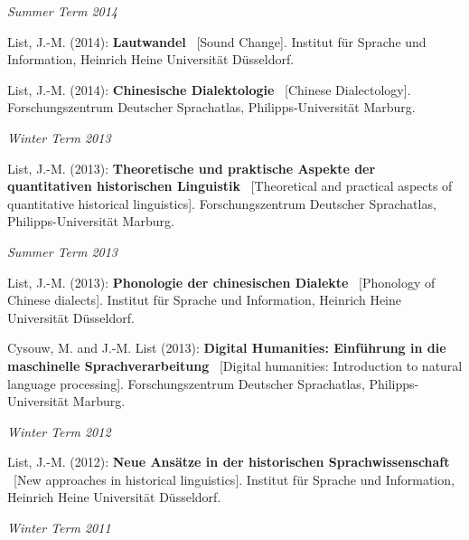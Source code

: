 \noindent\textit{Summer Term 2014}\par\nopagebreak\vspace{0.25cm}
\nopagebreak\noindent List, J.-M. (2014): \textbf{Lautwandel} \ [Sound Change]. Institut für Sprache und Information, Heinrich Heine Universität Düsseldorf.\vspace{0.25cm}
\par
\nopagebreak\noindent List, J.-M. (2014): \textbf{Chinesische Dialektologie} \ [Chinese Dialectology]. Forschungszentrum Deutscher Sprachatlas, Philipps-Universität Marburg.\vspace{0.25cm}
\par
\noindent\textit{Winter Term 2013}\par\nopagebreak\vspace{0.25cm}
\nopagebreak\noindent List, J.-M. (2013): \textbf{Theoretische und praktische Aspekte der quantitativen historischen Linguistik} \ [Theoretical and practical aspects of quantitative historical linguistics]. Forschungszentrum Deutscher Sprachatlas, Philipps-Universität Marburg.\vspace{0.25cm}
\par
\noindent\textit{Summer Term 2013}\par\nopagebreak\vspace{0.25cm}
\nopagebreak\noindent List, J.-M. (2013): \textbf{Phonologie der chinesischen Dialekte} \ [Phonology of Chinese dialects]. Institut für Sprache und Information, Heinrich Heine Universität Düsseldorf.\vspace{0.25cm}
\par
\nopagebreak\noindent Cysouw, M. and J.-M. List (2013): \textbf{Digital Humanities: Einführung in die maschinelle Sprachverarbeitung} \ [Digital humanities: Introduction to natural language processing]. Forschungszentrum Deutscher Sprachatlas, Philipps-Universität Marburg.\vspace{0.25cm}
\par
\noindent\textit{Winter Term 2012}\par\nopagebreak\vspace{0.25cm}
\nopagebreak\noindent List, J.-M. (2012): \textbf{Neue Ansätze in der historischen Sprachwissenschaft} \ [New approaches in historical linguistics]. Institut für Sprache und Information, Heinrich Heine Universität Düsseldorf.\vspace{0.25cm}
\par
\noindent\textit{Winter Term 2011}\par\nopagebreak\vspace{0.25cm}
